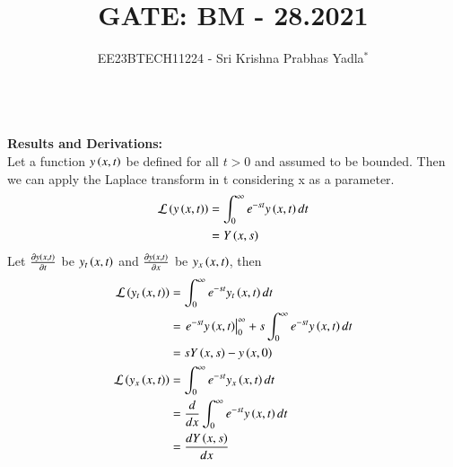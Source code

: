 \documentclass[journal,12pt,twocolumn]{IEEEtran}
\theoremstyle{remark}
\begin{document}

\vspace{3cm}

\title{GATE: BM - 28.2021}
\author{EE23BTECH11224 - Sri Krishna Prabhas Yadla$^{*}$%
}
\maketitle
\newpage
\bigskip

\renewcommand{\thefigure}{\arabic{figure}}
\renewcommand{\thetable}{\arabic{table}}


\vspace{3cm}
\\
\textbf{Results and Derivations:}
\\
Let a function $y\left(x,t\right)$ be defined for all $t>0$ and assumed to be bounded. Then we can apply the Laplace transform in t considering x as a parameter.
\begin{align}
 \mathcal{L}\left(y\left(x,t\right)\right) &= \int_{0}^{\infty}e^{-st}y\left(x,t\right)dt\\
 &= Y\left(x,s\right)
\end{align}
Let $\frac{\partial y\left(x,t\right)}{\partial t}$ be $y_t\left(x,t\right)$ and $\frac{\partial y\left(x,t\right)}{\partial x}$ be $y_x\left(x,t\right)$, then
\begin{align}
 \mathcal{L}\left(y_t\left(x,t\right)\right) &= \int_{0}^{\infty}e^{-st}y_t\left(x,t\right)dt\\
 &= \left. e^{-st}y\left(x,t\right)\right|_{0}^{\infty} + s\int_{0}^{\infty}e^{-st} y\left(x,t\right) dt\\
 &= sY\left(x,s\right) - y\left(x,0\right) \label{L(y_t(x,t))}\\
 \mathcal{L}\left(y_x\left(x,t\right)\right) &= \int_{0}^{\infty}e^{-st}y_x\left(x,t\right)dt\\
 &= \frac{d}{dx}\int_{0}^{\infty}e^{-st}y\left(x,t\right)dt \label{L(y_x(x,t))}\\
 &= \frac{dY\left(x,s\right)}{dx}
\end{align}
\end{document}

